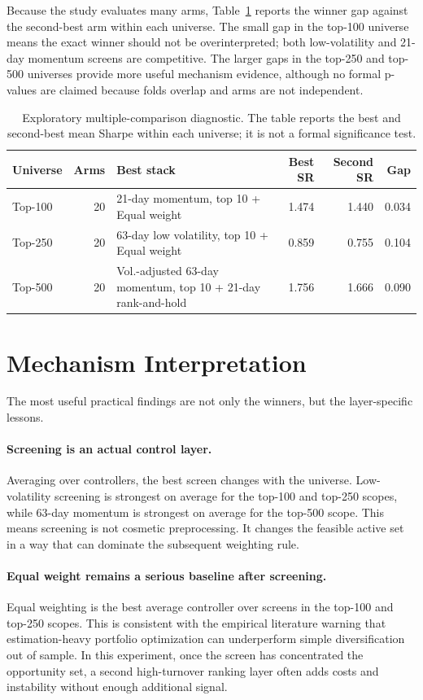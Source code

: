 \documentclass[11pt,a4paper]{article}
\begin{document}
Because the study evaluates many arms, Table~\ref{tab:multiple_testing} reports the winner gap against the second-best arm within each universe. The small gap in the top-100 universe means the exact winner should not be overinterpreted; both low-volatility and 21-day momentum screens are competitive. The larger gaps in the top-250 and top-500 universes provide more useful mechanism evidence, although no formal p-values are claimed because folds overlap and arms are not independent.
\begin{table}[H]
\centering
\caption{Exploratory multiple-comparison diagnostic. The table reports the best and second-best mean Sharpe within each universe; it is not a formal significance test.}
\label{tab:multiple_testing}
\small
\begin{tabular}{p{2.7cm}rp{6.0cm}rrr}
\toprule
Universe & Arms & Best stack & Best SR & Second SR & Gap \\
\midrule
Top-100 & 20 & 21-day momentum, top 10 + Equal weight & 1.474 & 1.440 & 0.034 \\
Top-250 & 20 & 63-day low volatility, top 10 + Equal weight & 0.859 & 0.755 & 0.104 \\
Top-500 & 20 & Vol.-adjusted 63-day momentum, top 10 + 21-day rank-and-hold & 1.756 & 1.666 & 0.090 \\
\bottomrule
\end{tabular}
\end{table}

\section{Mechanism Interpretation}
The most useful practical findings are not only the winners, but the layer-specific lessons.
\paragraph{Screening is an actual control layer.} Averaging over controllers, the best screen changes with the universe. Low-volatility screening is strongest on average for the top-100 and top-250 scopes, while 63-day momentum is strongest on average for the top-500 scope. This means screening is not cosmetic preprocessing. It changes the feasible active set in a way that can dominate the subsequent weighting rule.
\paragraph{Equal weight remains a serious baseline after screening.} Equal weighting is the best average controller over screens in the top-100 and top-250 scopes. This is consistent with the empirical literature warning that estimation-heavy portfolio optimization can underperform simple diversification out of sample. In this experiment, once the screen has concentrated the opportunity set, a second high-turnover ranking layer often adds costs and instability without enough additional signal.
\end{document}
